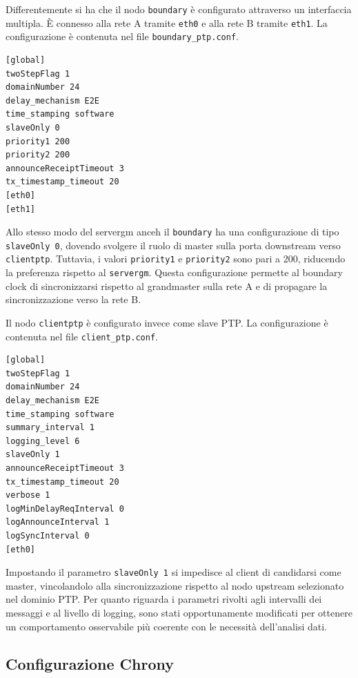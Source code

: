 Differentemente si ha che il nodo \texttt{boundary} è configurato attraverso un
interfaccia multipla. È connesso alla rete A tramite \texttt{eth0} e alla rete B
tramite \texttt{eth1}. La configurazione è contenuta nel file \texttt{boundary\_ptp.conf}.

\begin{lstlisting}[language=bash,caption={Configurazione PTP del nodo boundary.},label={lst:ptp-boundary}]
[global]
twoStepFlag 1
domainNumber 24
delay_mechanism E2E
time_stamping software
slaveOnly 0
priority1 200
priority2 200
announceReceiptTimeout 3
tx_timestamp_timeout 20
[eth0]
[eth1]
\end{lstlisting}

Allo stesso modo del servergm anceh il \texttt{boundary} ha una configurazione di
tipo \texttt{slaveOnly 0}, dovendo svolgere il ruolo di master sulla porta downstream
verso \texttt{clientptp}. Tuttavia, i valori \texttt{priority1} e \texttt{priority2}
sono pari a 200, riducendo la preferenza rispetto al \texttt{servergm}. Questa configurazione
permette al boundary clock di sincronizzarsi rispetto al grandmaster sulla rete A
e di propagare la sincronizzazione verso la rete B.

Il nodo \texttt{clientptp} è configurato invece come slave PTP. La configurazione
è contenuta nel file \texttt{client\_ptp.conf}.

\begin{lstlisting}[language=bash,caption={Configurazione PTP del nodo clientptp.},label={lst:ptp-client}]
[global]
twoStepFlag 1
domainNumber 24
delay_mechanism E2E
time_stamping software
summary_interval 1
logging_level 6
slaveOnly 1
announceReceiptTimeout 3
tx_timestamp_timeout 20
verbose 1
logMinDelayReqInterval 0
logAnnounceInterval 1
logSyncInterval 0
[eth0]
\end{lstlisting}

Impostando il parametro \texttt{slaveOnly 1} si impedisce al client di
candidarsi come master, vincolandolo alla sincronizzazione rispetto al nodo upstream
selezionato nel dominio PTP. Per quanto riguarda i parametri rivolti agli
intervalli dei messaggi e al livello di logging, sono stati opportunamente modificati
per ottenere un comportamento osservabile più coerente con le necessità dell'analisi dati.

\subsection{Configurazione Chrony}

